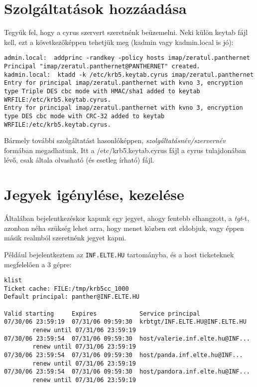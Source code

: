 \section{Szolgáltatások hozzáadása}
Tegyük fel, hogy a cyrus szervert szeretnénk beüzemelni. Neki külön keytab fájl kell, ezt a következőképpen tehetjük
meg (kadmin vagy kadmin.local is jó):

\begin{Verbatim}[frame=single,label=szolgáltatás principal hozzáadása]
admin.local:  addprinc -randkey -policy hosts imap/zeratul.panthernet
Principal "imap/zeratul.panthernet@PANTHERNET" created.
kadmin.local:  ktadd -k /etc/krb5.keytab.cyrus imap/zeratul.panthernet
Entry for principal imap/zeratul.panthernet with kvno 3, encryption
type Triple DES cbc mode with HMAC/sha1 added to keytab
WRFILE:/etc/krb5.keytab.cyrus.
Entry for principal imap/zeratul.panthernet with kvno 3, encryption
type DES cbc mode with CRC-32 added to keytab
WRFILE:/etc/krb5.keytab.cyrus.
\end{Verbatim}

Bármely további szolgáltatást hasonlóképpen, \emph{szolgáltatásnév/szervernév}  formában megadhatunk. Itt a
/etc/krb5.keytab.cyrus fájl a cyrus tulajdonában lévő, csak általa olvasható (és esetleg írható) fájl.


\section{Jegyek igénylése, kezelése}
Általában bejelentkezéskor kapunk egy jegyet, ahogy fentebb elhangzott, a \emph{tgt}-t, azonban néha szükség lehet
arra, hogy menet közben ezt eldobjuk, vagy éppen másik realmból szeretnénk jegyet kapni.

Például bejelentkeztem az \texttt{INF.ELTE.HU} tartományba, és a host ticketeknek megfelelően a 3 gépre:

\begin{Verbatim}[frame=single,label=klist]
klist
Ticket cache: FILE:/tmp/krb5cc_1000
Default principal: panther@INF.ELTE.HU

Valid starting     Expires            Service principal
07/30/06 23:59:19  07/31/06 09:59:30  krbtgt/INF.ELTE.HU@INF.ELTE.HU
        renew until 07/31/06 23:59:19
07/30/06 23:59:54  07/31/06 09:59:30  host/valerie.inf.elte.hu@INF...
        renew until 07/31/06 23:59:19
07/30/06 23:59:54  07/31/06 09:59:30  host/panda.inf.elte.hu@INF...
        renew until 07/31/06 23:59:19
07/30/06 23:59:54  07/31/06 09:59:30  host/pandora.inf.elte.hu@INF...
        renew until 07/31/06 23:59:19

\end{Verbatim}

